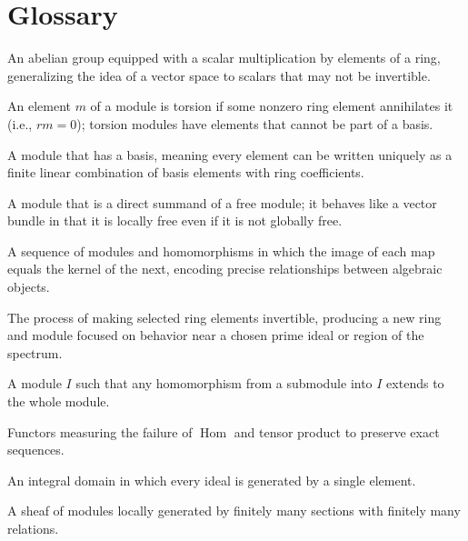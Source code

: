 \theoryapplications
{}

\section*{Glossary}
\begin{description}[leftmargin=*,style=nextline,itemsep=0.3em]
\item[\textbf{Module.}] An abelian group equipped with a scalar multiplication by elements of a ring, generalizing the idea of a vector space to scalars that may not be invertible.
\item[\textbf{Torsion.}] An element $m$ of a module is torsion if some nonzero ring element annihilates it (i.e., $rm=0$); torsion modules have elements that cannot be part of a basis.
\item[\textbf{Free module.}] A module that has a basis, meaning every element can be written uniquely as a finite linear combination of basis elements with ring coefficients.
\item[\textbf{Projective module.}] A module that is a direct summand of a free module; it behaves like a vector bundle in that it is locally free even if it is not globally free.
\item[\textbf{Exact sequence.}] A sequence of modules and homomorphisms in which the image of each map equals the kernel of the next, encoding precise relationships between algebraic objects.
\item[\textbf{Localization.}] The process of making selected ring elements invertible, producing a new ring and module focused on behavior near a chosen prime ideal or region of the spectrum.
\item[\textbf{Injective module.}] A module $I$ such that any homomorphism from a submodule into $I$ extends to the whole module.
\item[\textbf{Ext and Tor.}] Functors measuring the failure of $\operatorname{Hom}$ and tensor product to preserve exact sequences.
\item[\textbf{Principal ideal domain (PID).}] An integral domain in which every ideal is generated by a single element.
\item[\textbf{Coherent sheaf.}] A sheaf of modules locally generated by finitely many sections with finitely many relations.
\end{description}

